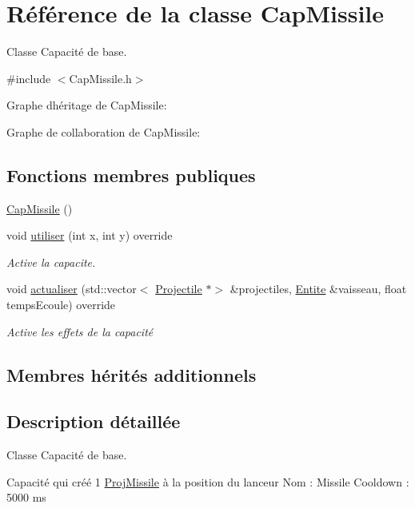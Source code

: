 \hypertarget{class_cap_missile}{}\section{Référence de la classe Cap\+Missile}
\label{class_cap_missile}


Classe Capacité de base.  




{\ttfamily \#include $<$Cap\+Missile.\+h$>$}



Graphe d\textquotesingle{}héritage de Cap\+Missile\+:


Graphe de collaboration de Cap\+Missile\+:
\subsection*{Fonctions membres publiques}
\begin{DoxyCompactItemize}
\item 
\hyperlink{class_cap_missile_a82f039eadaaba1712780a56598daae2a}{Cap\+Missile} ()
\item 
void \hyperlink{class_cap_missile_a4ba082615a3721083142549a4c8216ad}{utiliser} (int x, int y) override
\begin{DoxyCompactList}\small\item\em Active la capacite. \end{DoxyCompactList}\item 
void \hyperlink{class_cap_missile_adcb6a35330589c49910e6dd6cc7f2f7d}{actualiser} (std\+::vector$<$ \hyperlink{class_projectile}{Projectile} $\ast$$>$ \&projectiles, \hyperlink{class_entite}{Entite} \&vaisseau, float temps\+Ecoule) override
\begin{DoxyCompactList}\small\item\em Active les effets de la capacité \end{DoxyCompactList}\end{DoxyCompactItemize}
\subsection*{Membres hérités additionnels}


\subsection{Description détaillée}
Classe Capacité de base. 

Capacité qui créé 1 \hyperlink{class_proj_missile}{Proj\+Missile} à la position du lanceur Nom \+: Missile Cooldown \+: 5000 ms 

